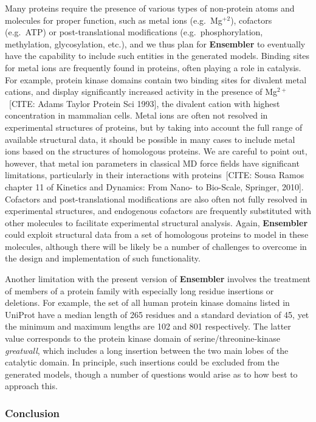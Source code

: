 \documentclass[aps,pre,twocolumn,nofootinbib,superscriptaddress,linenumbers]{revtex4-1}
\begin{document}
Many proteins require the presence of various types of non-protein atoms and molecules for proper function, such as metal ions (e.g.~Mg$^{+2}$), cofactors (e.g.~ATP) or post-translational modifications (e.g.~phosphorylation, methylation, glycosylation, etc.), and we thus plan for {\bf Ensembler} to eventually have the capability to include such entities in the generated models.
Binding sites for metal ions are frequently found in proteins, often playing a role in catalysis.
For example, protein kinase domains contain two binding sites for divalent metal cations, and display significantly increased activity in the presence of Mg$^{2+}$~[CITE: Adams Taylor Protein Sci 1993], the divalent cation with highest concentration in mammalian cells.
Metal ions are often not resolved in experimental structures of proteins, but by taking into account the full range of available structural data, it should be possible in many cases to include metal ions based on the structures of homologous proteins.
We are careful to point out, however, that metal ion parameters in classical MD force fields have significant limitations, particularly in their interactions with proteins~[CITE: Sousa Ramos chapter 11 of Kinetics and Dynamics: From Nano- to Bio-Scale, Springer, 2010].
Cofactors and post-translational modifications are also often not fully resolved in experimental structures, and endogenous cofactors are frequently substituted with other molecules to facilitate experimental structural analysis.
Again, {\bf Ensembler} could exploit structural data from a set of homologous proteins to model in these molecules, although there will be likely be a number of challenges to overcome in the design and implementation of such functionality.

Another limitation with the present version of {\bf Ensembler} involves the treatment of members of a protein family with especially long residue insertions or deletions.
For example, the set of all human protein kinase domains listed in UniProt have a median length of 265 residues and a standard deviation of 45, yet the minimum and maximum lengths are 102 and 801 respectively.
The latter value corresponds to the protein kinase domain of serine/threonine-kinase \emph{greatwall}, which includes a long insertion between the two main lobes of the catalytic domain.
In principle, such insertions could be excluded from the generated models, though a number of questions would arise as to how best to approach this.

\subsubsection*{Conclusion}
\end{document}
